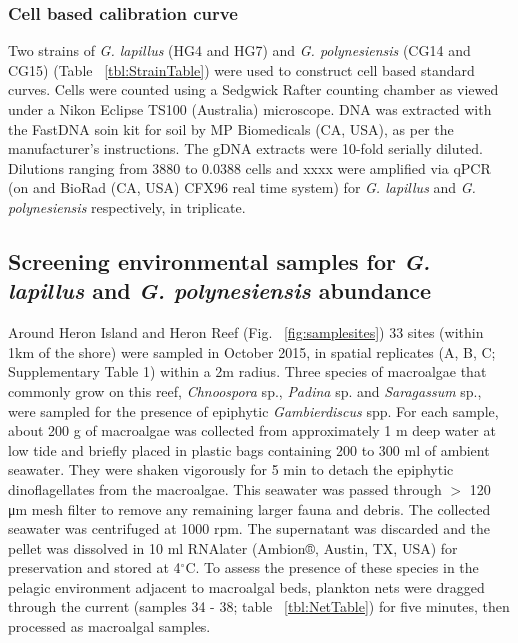 \documentclass[12pt]{article}
\begin{document}
\subsubsection*{Cell based calibration curve}
Two strains of \emph{G. lapillus} (HG4 and HG7) and \emph{G. polynesiensis} (CG14 and CG15) (Table ~\ref{tbl:StrainTable}) were used to construct cell based standard curves. Cells were counted using a Sedgwick Rafter counting chamber as viewed under a Nikon Eclipse TS100 (Australia) microscope. DNA was extracted with the FastDNA soin kit for soil by MP Biomedicals (CA, USA), as per the manufacturer's instructions. The gDNA extracts were 10-fold serially diluted. Dilutions ranging from 3880 to 0.0388 cells and {\Large xxxx} were amplified via qPCR ({\large on  and BioRad} (CA, USA) CFX96 real time system) for \emph{G. lapillus} and \emph{G. polynesiensis} respectively, in triplicate.

\subsection*{Screening environmental samples for \emph{G. lapillus} and \emph{G. polynesiensis} abundance}
Around Heron Island and Heron Reef (Fig. ~\ref{fig:samplesites}) 33 sites (within 1km of the shore) were sampled in October 2015, in spatial replicates (A, B, C; Supplementary Table 1) within a 2m radius. Three species of macroalgae that commonly grow on this reef, \textit{Chnoospora} sp., \textit{Padina} sp. and \textit{Saragassum} sp., were sampled for the presence of epiphytic \emph{Gambierdiscus} spp. For each sample, about 200 g of macroalgae was collected from approximately 1 m deep water at low tide and briefly placed in plastic bags containing 200 to 300 ml of ambient seawater. They were shaken vigorously for 5 min to detach the epiphytic dinoflagellates from the macroalgae. This seawater was passed through $>$ 120 μm mesh filter to remove any remaining larger fauna and debris. The collected seawater was centrifuged at 1000 rpm. The supernatant was discarded and the pellet was dissolved in 10 ml RNAlater (Ambion®, Austin, TX, USA) for preservation and stored at 4$^{\circ}$C.
To assess the presence of these species in the pelagic environment adjacent to macroalgal beds, plankton nets were dragged through the current (samples 34 - 38; table ~\ref{tbl:NetTable}) for five minutes, then processed as macroalgal samples.
\end{document}
